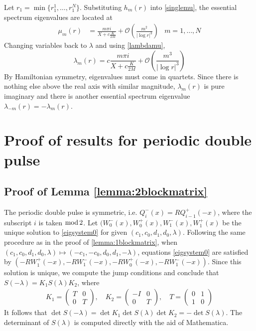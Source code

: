 \documentclass[10pt,reqno]{amsart}
\theoremstyle{plain}
\theoremstyle{definition}
\theoremstyle{remark}
\numberwithin{theorem}{section}
\numberwithin{equation}{section}
\begin{document}
Let $r_1 = \min\{ r_1^1, \dots, r_1^N \}$. Substituting $h_m(r)$ into \cref{singlemu}, the essential spectrum eigenvalues are located at
\begin{align*}
\mu_m(r) &= \frac{m \pi i}{X + c \frac{K}{2 M}} + \mathcal{O}\left( \frac{m^2}{|\log r|^3} \right) & m = 1, \dots, N
\end{align*}
Changing variables back to $\lambda$ and using \cref{lambdamu},
\[
\lambda_m(r) = c  \frac{m \pi i}{X + c \frac{K}{2 M}} + \mathcal{O}\left( \frac{m^3}{|\log r|^3} \right)
\]
By Hamiltonian symmetry, eigenvalues must come in quartets. Since there is nothing else above the real axis with similar magnitude, $\lambda_m(r)$ is pure imaginary and there is another essential spectrum eigenvalue $\lambda_{-m}(r) = -\lambda_m(r)$. 

\section{Proof of results for periodic double pulse}

\subsection{Proof of Lemma \ref{lemma:2blockmatrix} }

The periodic double pulse is symmetric, i.e. $Q_i^-(x) = R Q_{i-1}^+(-x)$, where the subscript $i$ is taken $\mathop\mathrm{mod}\nolimits 2$. Let $(W_0^-(x), W_0^+(x), W_1^-(x), W_1^+(x)$ be the unique solution to \cref{eigsystem0} for given $(c_1, c_0, d_1, d_0, \lambda)$. Following the same procedure as in the proof of \cref{lemma:1blockmatrix}, when $(c_1, c_0, d_1, d_0, \lambda) \mapsto (-c_1, -c_0, d_0, d_1, -\lambda)$, equations \cref{eigsystem0} are satisfied by $(-R W_1^+(-x), -R W_1^-(-x), -R W_0^+(-x), -R W_1^-(-x))$. Since this solution is unique, we compute the jump conditions and conclude that $S(-\lambda) = K_1 S(\lambda) K_2$, where
\begin{align*}
K_1 = \begin{pmatrix}T & 0 \\ 0 & T \end{pmatrix}, \quad
K_2 = \begin{pmatrix}-I & 0 \\ 0 & T \end{pmatrix}, \quad
T = \begin{pmatrix} 0 & 1 \\ 1 & 0 \end{pmatrix}
\end{align*}
It follows that $\det S(-\lambda) = \det K_1 \det S(\lambda) \det K_2 = -\det S(\lambda)$.
The determinant of $S(\lambda)$ is computed directly with the aid of Mathematica.
\end{document}
